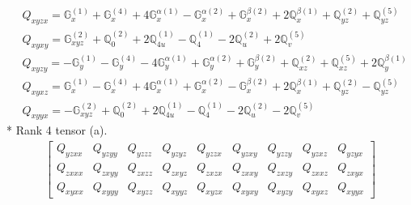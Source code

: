 \documentclass[fleqn,8pt,landscape]{jsarticle}
\begin{document}
\begin{align*}
& Q_{xyzx} = \mathbb{G}_{x}^{(1)} + \mathbb{G}_{x}^{(4)} + 4 \mathbb{G}_{x}^{\alpha(1)} - \mathbb{G}_{x}^{\alpha(2)} + \mathbb{G}_{x}^{\beta(2)} + 2 \mathbb{Q}_{x}^{\beta(1)} + \mathbb{Q}_{yz}^{(2)} + \mathbb{Q}_{yz}^{(5)} \\
& Q_{xyxy} = \mathbb{G}_{xyz}^{(2)} + \mathbb{Q}_{0}^{(2)} + 2 \mathbb{Q}_{4u}^{(1)} - \mathbb{Q}_{4}^{(1)} - 2 \mathbb{Q}_{u}^{(2)} + 2 \mathbb{Q}_{v}^{(5)} \\
& Q_{xyzy} = - \mathbb{G}_{y}^{(1)} - \mathbb{G}_{y}^{(4)} - 4 \mathbb{G}_{y}^{\alpha(1)} + \mathbb{G}_{y}^{\alpha(2)} + \mathbb{G}_{y}^{\beta(2)} + \mathbb{Q}_{xz}^{(2)} + \mathbb{Q}_{xz}^{(5)} + 2 \mathbb{Q}_{y}^{\beta(1)} \\
& Q_{xyxz} = \mathbb{G}_{x}^{(1)} - \mathbb{G}_{x}^{(4)} + 4 \mathbb{G}_{x}^{\alpha(1)} + \mathbb{G}_{x}^{\alpha(2)} - \mathbb{G}_{x}^{\beta(2)} + 2 \mathbb{Q}_{x}^{\beta(1)} + \mathbb{Q}_{yz}^{(2)} - \mathbb{Q}_{yz}^{(5)} \\
& Q_{xyyx} = - \mathbb{G}_{xyz}^{(2)} + \mathbb{Q}_{0}^{(2)} + 2 \mathbb{Q}_{4u}^{(1)} - \mathbb{Q}_{4}^{(1)} - 2 \mathbb{Q}_{u}^{(2)} - 2 \mathbb{Q}_{v}^{(5)}
\end{align*}
* Rank 4 tensor (a).
\begin{align*}
\begin{bmatrix} Q_{yzxx} & Q_{yzyy} & Q_{yzzz} & Q_{yzyz} & Q_{yzzx} & Q_{yzxy} & Q_{yzzy} & Q_{yzxz} & Q_{yzyx} \\ Q_{zxxx} & Q_{zxyy} & Q_{zxzz} & Q_{zxyz} & Q_{zxzx} & Q_{zxxy} & Q_{zxzy} & Q_{zxxz} & Q_{zxyx} \\ Q_{xyxx} & Q_{xyyy} & Q_{xyzz} & Q_{xyyz} & Q_{xyzx} & Q_{xyxy} & Q_{xyzy} & Q_{xyxz} & Q_{xyyx} \end{bmatrix}
\end{align*}
\end{document}

